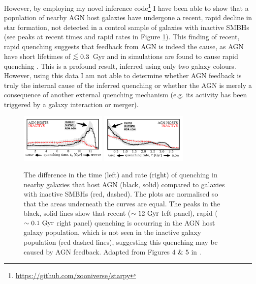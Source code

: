 \documentclass[11pt]{article}
\def\lesssim{\mathrel{\hbox{\rlap{\hbox{\lower3pt\hbox{$\sim$}}}\hbox{\raise2pt\hbox{$<$}}}}}
\begin{document}
However, by employing my novel inference code\footnote{\url{https://github.com/zooniverse/starpy}} I have been able to show that a population of nearby AGN host galaxies have undergone a recent, rapid decline in star formation, not detected in a control sample of galaxies with inactive SMBHs (see peaks at recent times and rapid rates in Figure \ref{timerate}). This finding of recent, rapid quenching suggests that feedback from AGN is indeed the cause, as AGN have short lifetimes of $\lesssim0.3$~Gyr \citep{martini04} and in simulations are found to cause rapid quenching \citep{tortora09}. This is a profound result, inferred using only two galaxy colours. However, using this data I am not able to determine whether AGN feedback is truly the internal cause of the inferred quenching or whether the AGN is merely a consequence of another external quenching mechanism (e.g. its activity has been triggered by a galaxy interaction or merger). 

\begin{figure}[t]
\begin{centering}
\includegraphics[width=0.375\textwidth]{quenching_time_all_masses_bootstrap_one_morphology.pdf}
\includegraphics[width=0.375\textwidth]{quenching_rate_all_masses_bootstrap_one_morphology.pdf}
\vspace{-0.5em}
\caption[8pt]{The difference in the time (left) and rate (right) of quenching in nearby galaxies that host AGN (black, solid) compared to galaxies with inactive SMBHs (red, dashed). The plots are normalised so that the areas underneath the curves are equal. The peaks in the black, solid lines show that recent ($\sim12~\rm{Gyr}$ left panel), rapid ($\sim0.1~\rm{Gyr}$ right panel) quenching is occurring in the AGN host galaxy population, which is not seen in the inactive galaxy population (red dashed lines), suggesting this quenching may be caused by AGN feedback. Adapted from Figures $4$ \& $5$ in \cite{smethurst16}.}
\label{timerate}
\end{centering}
\vspace{-1.5em}
\end{figure}
\end{document}
